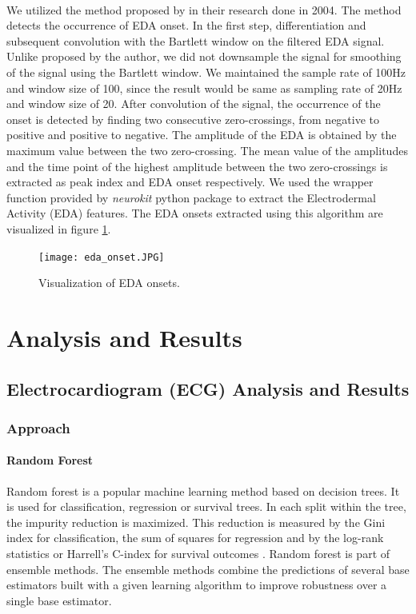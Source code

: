 \paragraph{} We utilized the method proposed by \citeauthor{kim_emotion_2004} in their research done in 2004. The method detects the occurrence of EDA onset. In the first step, differentiation and subsequent convolution with the Bartlett window on the filtered EDA signal. Unlike proposed by the author, we did not downsample the signal for smoothing of the signal using the Bartlett window. We maintained the sample rate of 100Hz and window size of 100, since the result would be same as sampling rate of 20Hz and window size of 20. After convolution of the signal, the occurrence of the onset is detected by finding two consecutive zero-crossings, from negative to positive and positive to negative. The amplitude of the EDA is obtained by the maximum value between the two zero-crossing. The mean value of the amplitudes and the time point of the highest amplitude between the two zero-crossings is extracted as peak index and EDA onset respectively. We used the wrapper function provided by \textit{neurokit} python package to extract the Electrodermal Activity (EDA) features. The EDA onsets extracted using this algorithm are visualized in figure \ref{fig:eda_onsets}.

\begin{figure}
    \centering
    \texttt{[image: eda\_onset.JPG]}
    \caption{Visualization of EDA onsets.}
    \label{fig:eda_onsets}
\end{figure}

\section{Analysis and Results}
\subsection{Electrocardiogram (ECG) Analysis and Results}
\subsubsection{Approach}
\paragraph{Random Forest} Random forest \cite{breiman2001random} is a popular machine learning method based on decision trees. It is used for classification, regression or survival trees. In each split within the tree, the impurity reduction is maximized. This reduction is measured by the Gini index for classification, the sum of squares for regression and by the log-rank statistics or Harrell's C-index for survival outcomes \cite{wright_splitting_2019}. Random forest is part of ensemble methods. The ensemble methods combine the predictions of several base estimators built with a given learning algorithm to improve robustness over a single base estimator.

